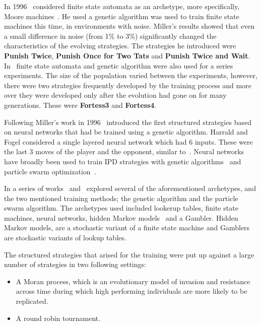 \documentclass{article}
\theoremstyle{definition}
\begin{document}
In 1996~\cite{Miller1996} considered finite state automata as an archetype, more
specifically, Moore machines~\cite{moore1956}. He used a genetic
algorithm was used to train finite state machines this time, in environments
with noise. Miller's results showed that even a small difference in noise (from
1\% to 3\%) significantly changed the characteristics of the evolving
strategies. The strategies he introduced were \textbf{Punish Twice}, \textbf{Punish
Once for Two Tats} and \textbf{Punish Twice and Wait}. In~\cite{Ashlock2006b}
finite state automata and genetic algorithm were also used for a series experiments.
The size of the population varied between the experiments, however, there
were two strategies frequently developed by the training process and more
over they were developed only after the evolution had gone on for many generations.
These were \textbf{Fortess3} and \textbf{Fortess4}.

Following Miller's work in 1996~\cite{Harrald1996} introduced the first
structured strategies based on neural networks that had be trained using a
genetic algorithm. Harrald and Fogel considered a single layered neural network
which had 6 inputs. These were the last 3 moves of the player and the opponent,
similar to~\cite{Axelrod1987}. Neural networks have broadly been used to train
IPD strategies with genetic algorithms~\cite{Ashlock2006a, Chong2005, Marks1999}
and particle swarm optimization~\cite{Franken2005}.

In a series of works~\cite{Knight2017} and~\cite{KnightHGC17} explored several
of the aforementioned archetypes, and the two mentioned training methods; the
genetic algorithm and the particle swarm algorithm. The archetypes used included
lookerup tables, finite state machines, neural networks, hidden Markov
models~\cite{eddy1996} and a Gambler. Hidden Markov models, are a stochastic
variant of a finite state machine and Gamblers are stochastic variants of lookup
tables.

The structured strategies that arised for the training were put up against a
large number of strategies in two following settings:

\begin{itemize}
    \item A Moran process, which is an evolutionary model of invasion and resistance across
    time during which high performing individuals are more likely to be replicated.
    \item A round robin tournament.
\end{itemize}
\end{document}
